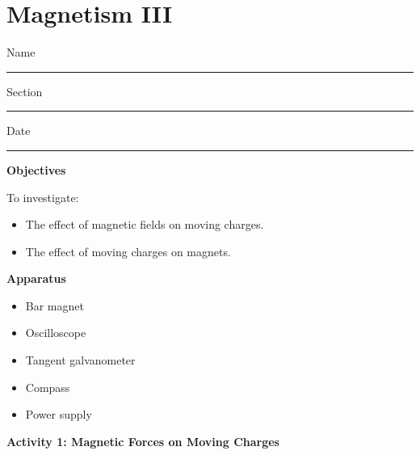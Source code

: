 
\section{Magnetism III}

Name \rule{2.0in}{0.1pt}\hfill{}Section \rule{1.0in}{0.1pt}\hfill{}Date
\rule{1.0in}{0.1pt}

\textbf{Objectives}

To investigate:

\begin{itemize}
\item The effect of magnetic fields on moving charges. 
\item The effect of moving charges on magnets. 
\end{itemize}

\textbf{Apparatus} 

\begin{itemize} 
\item Bar magnet
\item Oscilloscope
\item Tangent galvanometer
\item Compass
\item Power supply
\end{itemize}





\textbf{Activity 1: Magnetic Forces on Moving Charges }

